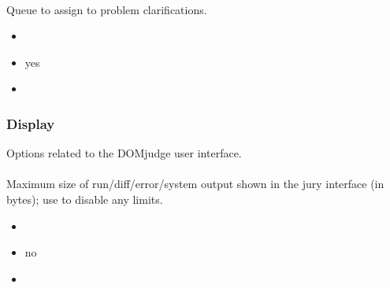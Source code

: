\documentclass[a4paper,10pt,english,openany]{sphinxmanual}
\begin{document}
\paragraph{}
\label{\detokenize{configuration-reference:clar-default-problem-queue}}
\sphinxAtStartPar
Queue to assign to problem clarifications.
\begin{itemize}
\item {} 
\sphinxAtStartPar
{} 

\item {} 
\sphinxAtStartPar
{} yes

\item {} 
\sphinxAtStartPar
{} \sphinxcode{\sphinxupquote{\textquotesingle{}\textquotesingle{}}}

\end{itemize}


\subsubsection{Display}
\label{\detokenize{configuration-reference:display}}
\sphinxAtStartPar
Options related to the DOMjudge user interface.


\paragraph{}
\label{\detokenize{configuration-reference:output-display-limit}}
\sphinxAtStartPar
Maximum size of run/diff/error/system output shown in the jury interface (in bytes); use  to disable any limits.
\begin{itemize}
\item {} 
\sphinxAtStartPar
{} 

\item {} 
\sphinxAtStartPar
{} no

\item {} 
\sphinxAtStartPar
{} 

\end{itemize}
\end{document}
